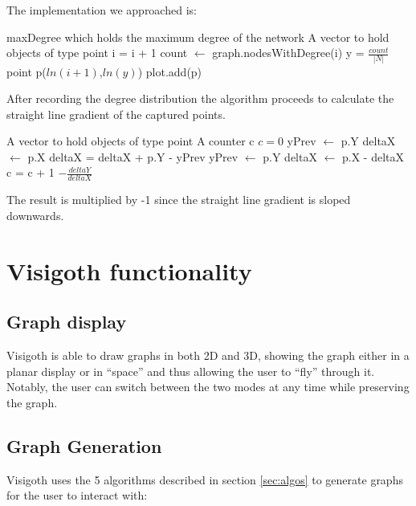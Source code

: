 \documentclass[a4paper,11pt,titlepage]{article}
\let\stdsection\section         %
\renewcommand{\section}{\newpage\stdsection}
\begin{document}
The implementation we approached is:

\begin{algorithmic}
  \REQUIRE maxDegree which holds the maximum degree of the network
  \REQUIRE A vector to hold objects of type point
    \STATE i = i + 1
    \STATE count $\gets$ graph.nodesWithDegree(i)
    \STATE y = $\frac{count}{|N|}$
      \STATE  point p($ln(i+1)$,$ln(y)$)
      \STATE plot.add(p)
    \ENDIF
  \ENDFOR
\end{algorithmic}

After recording the degree distribution the algorithm proceeds to
calculate the straight line gradient of the captured points.

\begin{algorithmic}
  \REQUIRE A vector to hold objects of type point
  \REQUIRE A counter c
  \STATE $c = 0$
      \STATE yPrev $\gets$ p.Y
      \STATE deltaX $\gets$ p.X
    \ELSE
      \STATE deltaX = deltaX + p.Y - yPrev
      \STATE yPrev $\gets$ p.Y
      \STATE deltaX $\gets$ p.X - deltaX
    \ENDIF
      \STATE c = c + 1
  \ENDFOR
  \RETURN $- \frac{deltaY}{deltaX}$
\end{algorithmic}

The result is multiplied by -1 since the straight line
gradient is sloped downwards.



\section{Visigoth functionality}


\subsection{Graph display}
Visigoth is able to draw graphs in both 2D and 3D, showing the graph
either in a planar display or in ``space'' and thus allowing the user
to ``fly'' through it. Notably, the user can switch between the two
modes at any time while preserving the graph.

\subsection{Graph Generation}
Visigoth uses the 5 algorithms described in section \ref{sec:algos} to generate
graphs for the user to interact with:
\end{document}
